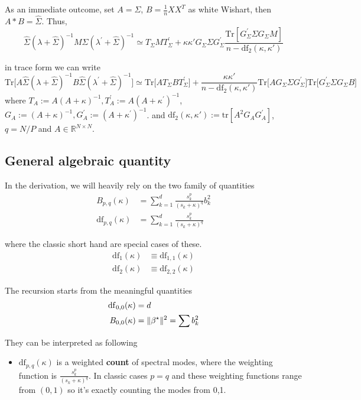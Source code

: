 As an immediate outcome, set $A=\Sigma$, $B=\frac{1}{n}XX^{T}$ as
white Wishart, then $A*B=\hat{\Sigma}$. Thus,
\[
\hat{\Sigma}(\lambda+\hat{\Sigma})^{-1}M\hat{\Sigma}(\lambda^{\prime}+\hat{\Sigma})^{-1}\simeq T_{\Sigma}MT_{\Sigma}^{\prime}+\kappa\kappa'G_{\Sigma}\Sigma G_{\Sigma}^{\prime}\frac{\mbox{Tr}\left[G_{\Sigma}^{\prime}\Sigma G_{\Sigma}M\right]}{n-\mathrm{df}_{2}(\kappa,\kappa')}
\]

in trace form we can write
\[
\mbox{Tr}\Big[A\hat{\Sigma}(\lambda+\hat{\Sigma})^{-1}B\hat{\Sigma}(\lambda^{\prime}+\hat{\Sigma})^{-1}\Big]\simeq\mbox{Tr}\big[AT_{\Sigma}BT_{\Sigma}^{\prime}\big]+\frac{\kappa\kappa'}{n-\mathrm{df}_{2}(\kappa,\kappa')}\mbox{Tr}\big[AG_{\Sigma}\Sigma G_{\Sigma}^{\prime}\big]\mbox{Tr}\big[G_{\Sigma}^{\prime}\Sigma G_{\Sigma}B\big]
\]
where $T_{A}:=A(A+\kappa)^{-1},T_{A}^{\prime}:=A(A+\kappa^{\prime})^{-1}$,
$G_{A}:=(A+\kappa)^{-1},G_{A}^{\prime}:=(A+\kappa^{\prime})^{-1}$.
and $\mathrm{df}_{2}(\kappa,\kappa'):=\mathrm{tr}[A^{2}G_{A}G_{A}^{\prime}]$,
$q=N/P$ and $A\in\mathbb{R}^{N\times N}$.

\subsection{General algebraic quantity}

In the derivation, we will heavily rely on the two family of quantities
\begin{align*}
B_{p,q}(\kappa) & =\sum_{k=1}^{d}\frac{s_{k}^{p}}{(s_{k}+\kappa)^{q}}b_{k}^{2}\\
\mathrm{df}_{p,q}(\kappa) & =\sum_{k=1}^{d}\frac{s_{k}^{p}}{(s_{k}+\kappa)^{q}}
\end{align*}

where the classic short hand are special cases of these.
\begin{align*}
\mathrm{df}_{1}(\kappa) & \equiv\mathrm{df}_{1,1}(\kappa)\\
\mathrm{df}_{2}(\kappa) & \equiv\mathrm{df}_{2,2}(\kappa)
\end{align*}

The recursion starts from the meaningful quantities
\begin{align*}
\mathrm{df}_{0,0}(\kappa) & =d\\
B_{0,0}(\kappa) & =\|{\beta^{\star}}\|^{2}=\sum b_{k}^{2}
\end{align*}

They can be interpreted as following
\begin{itemize}
\item $\mathrm{df}_{p,q}(\kappa)$ is a weighted \textbf{count} of spectral
modes, where the weighting function is $\frac{s_{k}^{p}}{(s_{k}+\kappa)^{q}}$.
In classic cases $p=q$ and these weighting functions range from $(0,1)$
so it's exactly counting the modes from 0,1.
\end{itemize}

